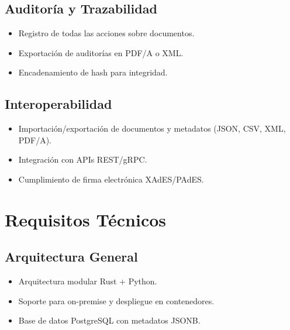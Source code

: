 \documentclass[12pt,a4paper]{article}
\begin{document}
\subsection{Auditoría y Trazabilidad}
\begin{itemize}
    \item Registro de todas las acciones sobre documentos.
    \item Exportación de auditorías en PDF/A o XML.
    \item Encadenamiento de hash para integridad.
\end{itemize}

\subsection{Interoperabilidad}
\begin{itemize}
    \item Importación/exportación de documentos y metadatos (JSON, CSV, XML, PDF/A).
    \item Integración con APIs REST/gRPC.
    \item Cumplimiento de firma electrónica XAdES/PAdES.
\end{itemize}

\section{Requisitos Técnicos}

\subsection{Arquitectura General}
\begin{itemize}
    \item Arquitectura modular Rust + Python.
    \item Soporte para on-premise y despliegue en contenedores.
    \item Base de datos PostgreSQL con metadatos JSONB.
\end{itemize}
\end{document}
